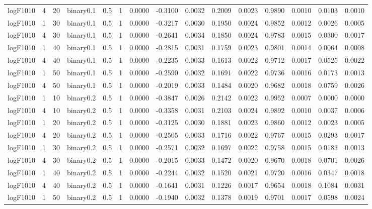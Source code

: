 \begin{longtable}{rrrrrrrrrrrrrrr}
  logF1010 & 4 & 20 & binary0.1 & 0.5 & 1 & 0.0000 & -0.3100 & 0.0032 & 0.2009 & 0.0023 & 0.9890 & 0.0010 & 0.0103 & 0.0010 \\ 
  logF1010 & 1 & 30 & binary0.1 & 0.5 & 1 & 0.0000 & -0.3217 & 0.0030 & 0.1950 & 0.0024 & 0.9852 & 0.0012 & 0.0026 & 0.0005 \\ 
  logF1010 & 4 & 30 & binary0.1 & 0.5 & 1 & 0.0000 & -0.2641 & 0.0034 & 0.1850 & 0.0024 & 0.9783 & 0.0015 & 0.0300 & 0.0017 \\ 
  logF1010 & 1 & 40 & binary0.1 & 0.5 & 1 & 0.0000 & -0.2815 & 0.0031 & 0.1759 & 0.0023 & 0.9801 & 0.0014 & 0.0064 & 0.0008 \\ 
  logF1010 & 4 & 40 & binary0.1 & 0.5 & 1 & 0.0000 & -0.2235 & 0.0033 & 0.1613 & 0.0022 & 0.9712 & 0.0017 & 0.0525 & 0.0022 \\ 
  logF1010 & 1 & 50 & binary0.1 & 0.5 & 1 & 0.0000 & -0.2590 & 0.0032 & 0.1691 & 0.0022 & 0.9736 & 0.0016 & 0.0173 & 0.0013 \\ 
  logF1010 & 4 & 50 & binary0.1 & 0.5 & 1 & 0.0000 & -0.2019 & 0.0033 & 0.1484 & 0.0020 & 0.9682 & 0.0018 & 0.0759 & 0.0026 \\ 
  logF1010 & 1 & 10 & binary0.2 & 0.5 & 1 & 0.0000 & -0.3847 & 0.0026 & 0.2142 & 0.0022 & 0.9952 & 0.0007 & 0.0000 & 0.0000 \\ 
  logF1010 & 4 & 10 & binary0.2 & 0.5 & 1 & 0.0000 & -0.3358 & 0.0031 & 0.2103 & 0.0024 & 0.9892 & 0.0010 & 0.0037 & 0.0006 \\ 
  logF1010 & 1 & 20 & binary0.2 & 0.5 & 1 & 0.0000 & -0.3125 & 0.0030 & 0.1881 & 0.0023 & 0.9860 & 0.0012 & 0.0023 & 0.0005 \\ 
  logF1010 & 4 & 20 & binary0.2 & 0.5 & 1 & 0.0000 & -0.2505 & 0.0033 & 0.1716 & 0.0022 & 0.9767 & 0.0015 & 0.0293 & 0.0017 \\ 
  logF1010 & 1 & 30 & binary0.2 & 0.5 & 1 & 0.0000 & -0.2571 & 0.0032 & 0.1697 & 0.0022 & 0.9758 & 0.0015 & 0.0183 & 0.0013 \\ 
  logF1010 & 4 & 30 & binary0.2 & 0.5 & 1 & 0.0000 & -0.2015 & 0.0033 & 0.1472 & 0.0020 & 0.9670 & 0.0018 & 0.0701 & 0.0026 \\ 
  logF1010 & 1 & 40 & binary0.2 & 0.5 & 1 & 0.0000 & -0.2244 & 0.0032 & 0.1520 & 0.0021 & 0.9720 & 0.0016 & 0.0347 & 0.0018 \\ 
  logF1010 & 4 & 40 & binary0.2 & 0.5 & 1 & 0.0000 & -0.1641 & 0.0031 & 0.1226 & 0.0017 & 0.9654 & 0.0018 & 0.1084 & 0.0031 \\ 
  logF1010 & 1 & 50 & binary0.2 & 0.5 & 1 & 0.0000 & -0.1940 & 0.0032 & 0.1378 & 0.0019 & 0.9701 & 0.0017 & 0.0598 & 0.0024 \\ 

\end{longtable}
